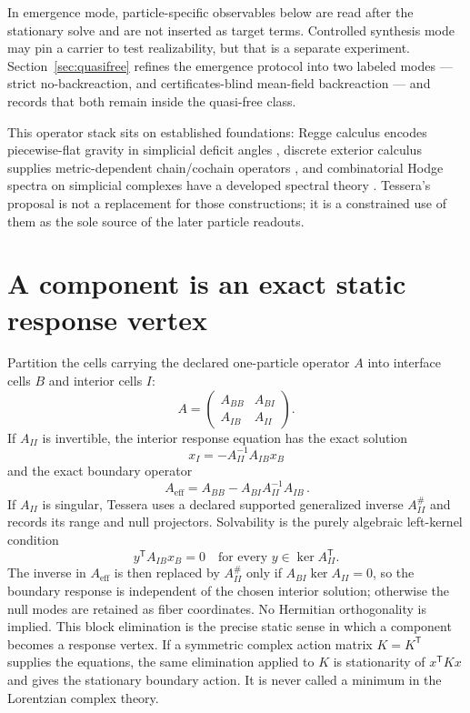 \documentclass[11pt,letterpaper]{article}
\begin{document}
In emergence mode, particle-specific observables below are
read after the stationary solve and are not inserted as target terms. Controlled
synthesis mode may pin a carrier to test realizability, but that is a separate
experiment. Section~\ref{sec:quasifree} refines the emergence protocol into two
labeled modes --- strict no-backreaction, and certificates-blind mean-field
backreaction --- and records that both remain inside the quasi-free class.

This operator stack sits on established foundations: Regge calculus encodes
piecewise-flat gravity in simplicial deficit angles \cite{regge1961}, discrete
exterior calculus supplies metric-dependent chain/cochain operators
\cite{dec2005}, and combinatorial Hodge spectra on simplicial complexes have a
developed spectral theory \cite{horakjost2013}. Tessera's proposal is not a
replacement for those constructions; it is a constrained use of them as the
sole source of the later particle readouts.

\section{A component is an exact static response vertex}\label{sec:vertex}

Partition the cells carrying the declared one-particle operator $A$ into
interface cells $B$ and interior cells $I$:
\begin{equation*}
  A=\begin{pmatrix}A_{BB}&A_{BI}\\A_{IB}&A_{II}\end{pmatrix}.
\end{equation*}
If $A_{II}$ is invertible, the interior response equation has the exact
solution
\begin{equation*}
  x_I=-A_{II}^{-1}A_{IB}x_B
\end{equation*}
and the exact boundary operator
\begin{equation*}
  \boxed{\,A_{\mathrm{eff}}
  =A_{BB}-A_{BI}A_{II}^{-1}A_{IB}\,}.
\end{equation*}
If $A_{II}$ is singular, Tessera uses a declared supported generalized inverse
$A_{II}^{\#}$ and records its range and null projectors. Solvability is the
purely algebraic left-kernel condition
\begin{equation*}
  y^{\mathsf T}A_{IB}x_B=0
  \quad\text{for every }y\in\ker A_{II}^{\mathsf T}.
\end{equation*}
The inverse in $A_{\mathrm{eff}}$ is then replaced by $A_{II}^{\#}$ only if
$A_{BI}\ker A_{II}=0$, so the boundary response is independent of the chosen
interior solution; otherwise the null modes are retained as fiber coordinates.
No Hermitian orthogonality is implied. This block elimination is the precise
static sense in which a component becomes a response vertex. If a symmetric
complex action matrix $K=K^{\mathsf T}$ supplies the equations, the same
elimination applied to $K$ is stationarity of $x^{\mathsf T}Kx$ and gives the
stationary boundary action. It is never called a minimum in the Lorentzian
complex theory.
\end{document}
